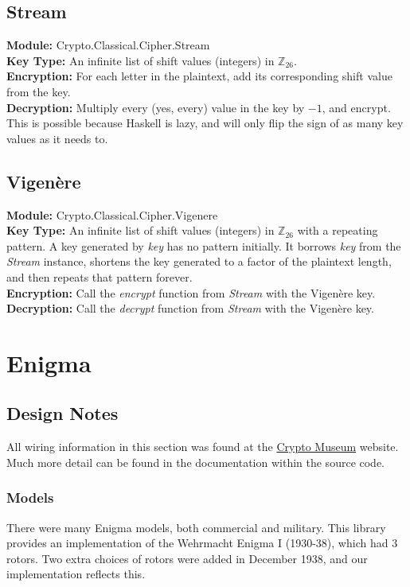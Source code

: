 \documentclass{article}
\begin{document}
\subsection{Stream}
\textbf{Module:} Crypto.Classical.Cipher.Stream\\
\textbf{Key Type:} An infinite list of shift values (integers) in
$\mathbb{Z}_{26}$.\\
\textbf{Encryption:} For each letter in the plaintext, add its corresponding
shift value from the key.\\
\textbf{Decryption:} Multiply every (yes, every) value in the key by $-1$,
and encrypt. This is possible because Haskell is lazy, and will only
flip the sign of as many key values as it needs to.

\subsection{Vigenère}
\textbf{Module:} Crypto.Classical.Cipher.Vigenere\\
\textbf{Key Type:} An infinite list of shift values (integers) in
$\mathbb{Z}_{26}$ with a repeating pattern.
A key generated by \emph{key} has no pattern initially.
It borrows \emph{key} from the \emph{Stream} instance,
shortens the key generated to a factor of the plaintext length,
and then repeats
that pattern forever.\\
\textbf{Encryption:} Call the \emph{encrypt} function from \emph{Stream}
with the Vigenère key.\\
\textbf{Decryption:} Call the \emph{decrypt} function from \emph{Stream}
with the Vigenère key.


\section{Enigma}

\subsection{Design Notes}
All wiring information in this section was found at the
\href{http://www.cryptomuseum.com/crypto/enigma/wiring.htm}{Crypto Museum}
website. Much more detail can be found in the documentation within
the source code.

\subsubsection{Models}
There were many Enigma models, both commercial and military. This library
provides an implementation of the Wehrmacht Enigma I (1930-38), which
had 3 rotors. Two extra choices of rotors were added in December 1938, and
our implementation reflects this.
\end{document}
